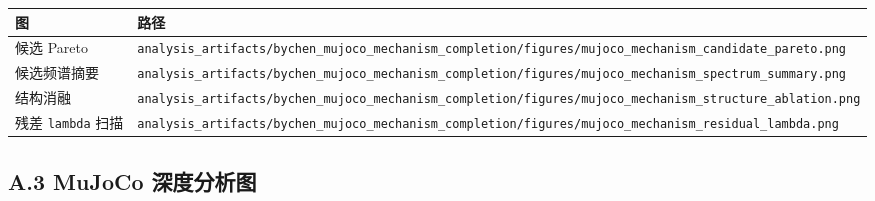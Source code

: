 \begin{longtable}[]{@{}
  >{\raggedright\arraybackslash}p{}
  >{\raggedright\arraybackslash}p{}@{}}
\toprule\noalign{}
\begin{minipage}[b]{\linewidth}\raggedright
图
\end{minipage} & \begin{minipage}[b]{\linewidth}\raggedright
路径
\end{minipage} \\
\midrule\noalign{}
\endhead
\bottomrule\noalign{}
\endlastfoot
候选 Pareto & \texttt{analysis\_artifacts/bychen\_mujoco\_mechanism\_completion/figures/mujoco\_mechanism\_candidate\_pareto.png} \\
候选频谱摘要 & \texttt{analysis\_artifacts/bychen\_mujoco\_mechanism\_completion/figures/mujoco\_mechanism\_spectrum\_summary.png} \\
结构消融 & \texttt{analysis\_artifacts/bychen\_mujoco\_mechanism\_completion/figures/mujoco\_mechanism\_structure\_ablation.png} \\
残差 \texttt{lambda} 扫描 & \texttt{analysis\_artifacts/bychen\_mujoco\_mechanism\_completion/figures/mujoco\_mechanism\_residual\_lambda.png} \\
\end{longtable}

\subsection{A.3 MuJoCo 深度分析图}\label{a.3-mujoco-ux6df1ux5ea6ux5206ux6790ux56fe}

